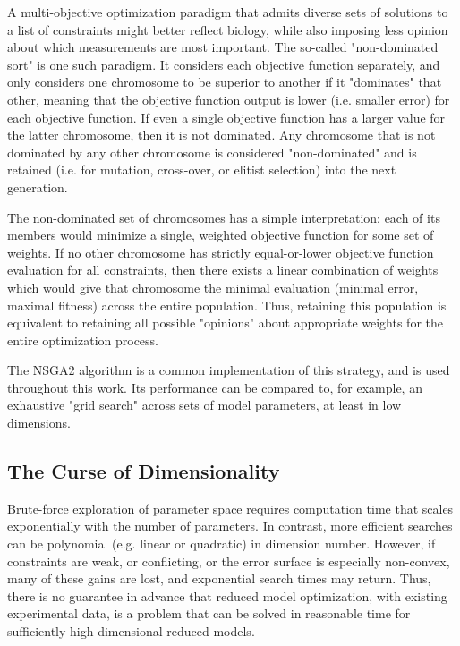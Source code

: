 A multi-objective optimization paradigm that admits diverse sets of solutions to a list of constraints might better reflect biology, while also imposing less opinion about which measurements are most important.
The so-called "non-dominated sort" is one such paradigm.
It considers each objective function separately, and only considers one chromosome to be superior to another if it "dominates" that other, meaning that the objective function output is lower (i.e. smaller error) for each objective function.
If even a single objective function has a larger value for the latter chromosome, then it is not dominated.  Any chromosome that is not dominated by any other chromosome is considered "non-dominated" and is retained (i.e. for mutation, cross-over, or elitist selection) into the next generation.

The non-dominated set of chromosomes has a simple interpretation: each of its members would minimize a single, weighted objective function for some set of weights.
If no other chromosome has strictly equal-or-lower objective function evaluation for all constraints, then there exists a linear combination of weights which would give that chromosome the minimal evaluation (minimal error, maximal fitness) across the entire population.
Thus, retaining this population is equivalent to retaining all possible "opinions" about appropriate weights for the entire optimization process.

The NSGA2 algorithm \cite{deb2000fast} is a common implementation of this strategy, and is used throughout this work. Its performance can be compared to, for example, an exhaustive "grid search" across sets of model parameters, at least in low dimensions.  

\subsection{The Curse of Dimensionality}
Brute-force exploration of parameter space requires computation time that scales exponentially with the number of parameters.  In contrast, more efficient searches can be polynomial (e.g. linear or quadratic) in dimension number.  However, if constraints are weak, or conflicting, or the error surface is especially non-convex, many of these gains are lost, and exponential search times may return.  Thus, there is no guarantee in advance that reduced model optimization, with existing experimental data, is a problem that can be solved in reasonable time for sufficiently high-dimensional reduced models.

